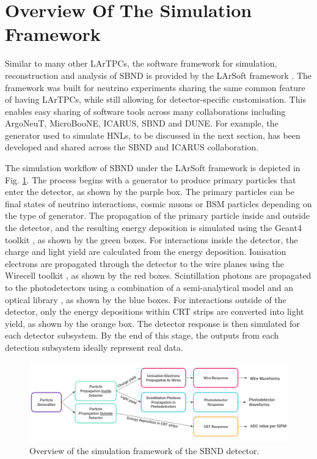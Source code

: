\section{Overview Of The Simulation Framework}
\label{sec:overview_sim}

Similar to many other LArTPCs, the software framework for simulation, reconstruction and analysis of SBND is provided by the LArSoft framework \cite{larsoft}. 
The framework was built for neutrino experiments sharing the same common feature of having LArTPCs, while still allowing for detector-specific customisation. 
This enables easy sharing of software tools across many collaborations including ArgoNeuT, MicroBooNE, ICARUS, SBND and DUNE. 
For example, the generator used to simulate HNLs, to be discussed in the next section, has been developed and shared across the SBND and ICARUS collaboration.

The simulation workflow of SBND under the LArSoft framework is depicted in Fig. \ref{fig:Sim_Workflow}.
The process begins with a generator to produce primary particles that enter the detector, as shown by the purple box.
The primary particles can be final states of neutrino interactions, cosmic muons or BSM particles depending on the type of generator.
The propagation of the primary particle inside and outside the detector, and the resulting energy deposition is simulated using the Geant4 toolkit \cite{geant4}, as shown by the green boxes.
For interactions inside the detector, the charge and light yield are calculated from the energy deposition.
Ionisation electrons are propagated through the detector to the wire planes using the Wirecell toolkit \cite{wirecell}, as shown by the red boxes.
Scintillation photons are propagated to the photodetectors using a combination of a semi-analytical model and an optical library \cite{sbnd_pds_paper}, as shown by the blue boxes.
For interactions outside of the detector, only the energy depositions within CRT strips are converted into light yield, as shown by the orange box.
The detector response is then simulated for each detector subsystem.
By the end of this stage, the outputs from each detection subsystem ideally represent real data.

\begin{figure}[htbp!] 
\centering    
\includegraphics[width=1.0\textwidth]{Sim_Workflow}
\caption[Simulation Framework of SBND]{
Overview of the simulation framework of the SBND detector.
}
\label{fig:Sim_Workflow}
\end{figure}

